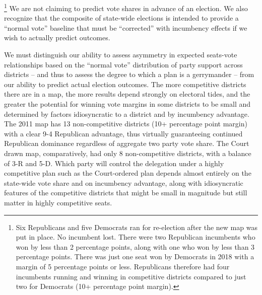         \footnote{Six Republicans and five Democrats ran for re-election after the new map was put in place. No incumbent lost. There were two Republican incumbents who won by less than 2 percentage points, along with one who won by less than 3 percentage points. There was just one seat won by Democrats in 2018 with a margin of 5 percentage points or less. Republicans therefore had four incumbents running and winning in competitive districts compared to just two for Democrats (10+ percentage point margin).}
    We are not claiming to predict vote shares in advance of an election. We also recognize that the composite of state-wide elections is intended to provide a ``normal vote'' baseline that must be ``corrected'' with incumbency effects if we wish to actually predict outcomes.
\par
    We must distinguish our ability to assess asymmetry in expected seats-vote relationships based on the ``normal vote'' distribution of party support across districts -- and thus to assess the degree to which a plan is a gerrymander -- from our ability to predict actual election outcomes. The more competitive districts there are in a map, the more results depend strongly on electoral tides, and the greater the potential for winning vote margins in some districts to be small and determined by factors idiosyncratic to a district and by incumbency advantage. The 2011 map has 13 non-competitive districts (10+ percentage point margin) with a clear 9-4 Republican advantage, thus virtually guaranteeing continued Republican dominance regardless of aggregate two party vote share. The Court drawn map, comparatively, had only 8 non-competitive districts, with a balance of 3-R and 5-D. Which party will control the delegation under a highly competitive plan such as the Court-ordered plan depends almost entirely on the state-wide vote share and on incumbency advantage, along with idiosyncratic features of the competitive districts that might be small in magnitude but still matter in highly competitive seats. 
\par
